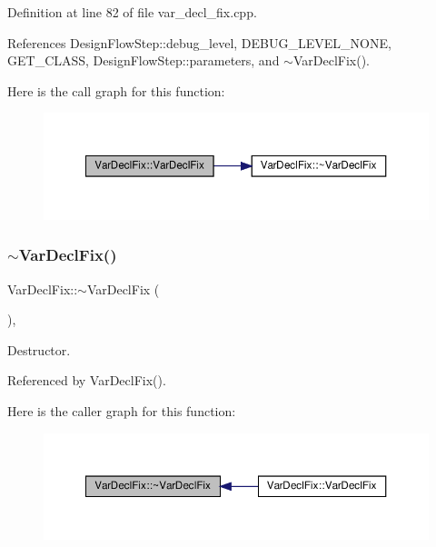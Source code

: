 Definition at line 82 of file var\+\_\+decl\+\_\+fix.\+cpp.



References Design\+Flow\+Step\+::debug\+\_\+level, D\+E\+B\+U\+G\+\_\+\+L\+E\+V\+E\+L\+\_\+\+N\+O\+NE, G\+E\+T\+\_\+\+C\+L\+A\+SS, Design\+Flow\+Step\+::parameters, and $\sim$\+Var\+Decl\+Fix().

Here is the call graph for this function\+:
\nopagebreak
\begin{figure}[H]
\begin{center}
\leavevmode
\includegraphics[width=350pt]{db/d32/classVarDeclFix_a8183b24fc37a61ac7045b26ddcc648a8_cgraph}
\end{center}
\end{figure}
\mbox{\label{classVarDeclFix_a6f0e5d0cab5b56639d77e0612816707f}} 
\subsubsection{\texorpdfstring{$\sim$\+Var\+Decl\+Fix()}{~VarDeclFix()}}
{\footnotesize\ttfamily Var\+Decl\+Fix\+::$\sim$\+Var\+Decl\+Fix (\begin{DoxyParamCaption}{ }\end{DoxyParamCaption})\hspace{0.3cm}{\ttfamily [override]}, {\ttfamily [default]}}



Destructor. 



Referenced by Var\+Decl\+Fix().

Here is the caller graph for this function\+:
\nopagebreak
\begin{figure}[H]
\begin{center}
\leavevmode
\includegraphics[width=350pt]{db/d32/classVarDeclFix_a6f0e5d0cab5b56639d77e0612816707f_icgraph}
\end{center}
\end{figure}


